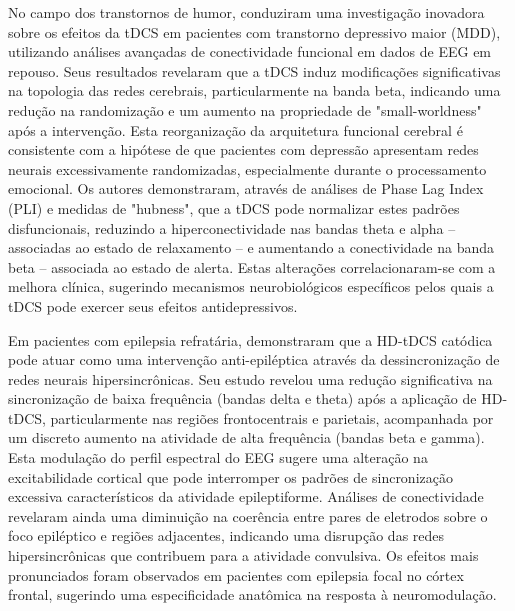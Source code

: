 No campo dos transtornos de humor,  conduziram uma investigação inovadora sobre os efeitos da tDCS em pacientes com transtorno depressivo maior (MDD), utilizando análises avançadas de conectividade funcional em dados de EEG em repouso. Seus resultados revelaram que a tDCS induz modificações significativas na topologia das redes cerebrais, particularmente na banda beta, indicando uma redução na randomização e um aumento na propriedade de "small-worldness" após a intervenção. Esta reorganização da arquitetura funcional cerebral é consistente com a hipótese de que pacientes com depressão apresentam redes neurais excessivamente randomizadas, especialmente durante o processamento emocional. Os autores demonstraram, através de análises de Phase Lag Index (PLI) e medidas de "hubness", que a tDCS pode normalizar estes padrões disfuncionais, reduzindo a hiperconectividade nas bandas theta e alpha – associadas ao estado de relaxamento – e aumentando a conectividade na banda beta – associada ao estado de alerta. Estas alterações correlacionaram-se com a melhora clínica, sugerindo mecanismos neurobiológicos específicos pelos quais a tDCS pode exercer seus efeitos antidepressivos.

Em pacientes com epilepsia refratária,  demonstraram que a HD-tDCS catódica pode atuar como uma intervenção anti-epiléptica através da dessincronização de redes neurais hipersincrônicas. Seu estudo revelou uma redução significativa na sincronização de baixa frequência (bandas delta e theta) após a aplicação de HD-tDCS, particularmente nas regiões frontocentrais e parietais, acompanhada por um discreto aumento na atividade de alta frequência (bandas beta e gamma). Esta modulação do perfil espectral do EEG sugere uma alteração na excitabilidade cortical que pode interromper os padrões de sincronização excessiva característicos da atividade epileptiforme. Análises de conectividade revelaram ainda uma diminuição na coerência entre pares de eletrodos sobre o foco epiléptico e regiões adjacentes, indicando uma disrupção das redes hipersincrônicas que contribuem para a atividade convulsiva. Os efeitos mais pronunciados foram observados em pacientes com epilepsia focal no córtex frontal, sugerindo uma especificidade anatômica na resposta à neuromodulação.

